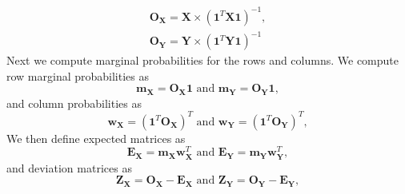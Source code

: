 \documentclass[12pt]{article}
\begin{document}
\begin{equation}
\begin{aligned}
{\mathbf O}_{\mathbf X} = {\mathbf X} \times ({\mathbf 1}^{T}{\mathbf X} {\mathbf 1})^{-1}, \\
{\mathbf O}_{\mathbf Y} = {\mathbf Y} \times ({\mathbf 1}^{T}{\mathbf Y} {\mathbf 1})^{-1}
\label{eq:observedXY}
\end{aligned}
\end{equation} Next we compute marginal probabilities for the rows and
columns. We compute row marginal probabilities as \begin{equation}
{\mathbf m}_{\mathbf X} = {\mathbf O}_{\mathbf X}{\mathbf 1} \text{ and } {\mathbf m}_{\mathbf Y} = {\mathbf O}_{\mathbf Y}{\mathbf 1},
\label{eq:xy_rowvecs}
\end{equation} and column probabilities as \begin{equation}
{\mathbf w}_{\mathbf X} = ({\mathbf 1}^{T}{\mathbf O}_{\mathbf X})^{T} \text{ and } {\mathbf w}_{\mathbf Y} = ({\mathbf 1}^{T}{\mathbf O}_{\mathbf Y})^{T},
\label{eq:weightmats_v1}
\end{equation} We then define expected matrices as \begin{equation}
{\mathbf E}_{\mathbf X} = {\mathbf m}_{\mathbf X}{\mathbf w}_{\mathbf X}^{T} \text{ and } {\mathbf E}_{\mathbf Y} = {\mathbf m}_{\mathbf Y}{\mathbf w}_{\mathbf Y}^{T},
\label{eq:models}
\end{equation} and deviation matrices as \begin{equation}
{\mathbf Z}_{\mathbf X} = {\mathbf O}_{\mathbf X} - {\mathbf E}_{\mathbf X} \text{ and } {\mathbf Z}_{\mathbf Y} = {\mathbf O}_{\mathbf Y} - {\mathbf E}_{\mathbf Y},
\label{eq:plscar_Zs}
\end{equation}
\end{document}
